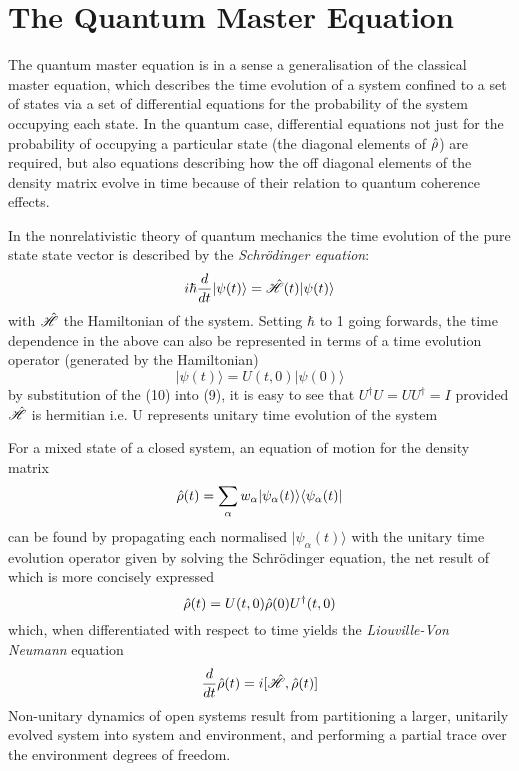
\section{The Quantum Master Equation}
The quantum master equation is in a sense a generalisation of the classical master equation, which describes the time evolution of a system confined to a set of states via a set of differential equations for the probability of the system occupying each state. In the quantum case, differential equations not just for the probability of occupying a particular state (the diagonal elements of $\hat{\rho}$) are required, but also equations describing how the off diagonal elements of the density matrix evolve in time because of their relation to quantum coherence effects.

In the nonrelativistic theory of quantum mechanics the time evolution of the pure state state vector is described by the \emph{Schr\"odinger equation}:
\begin{equation}
	i\hbar \frac{d}{dt} |\psi(t)\rangle = \hat{\mathscr{H}}(t) |\psi(t) \rangle
\end{equation}
with $\hat{\mathscr{H}}$ the Hamiltonian of the system. Setting $\hbar$ to 1 going forwards, the time dependence in the above can also be represented in terms of a time evolution operator (generated by the Hamiltonian)
\begin{equation}
	|\psi(t) \rangle = U(t, 0) | \psi(0) \rangle
\end{equation}
by substitution of the (10) into (9), it is easy to see that $U^{\dagger}U = UU^\dagger = I$ provided $\hat{\mathscr{H}}$ is hermitian i.e. U represents unitary time evolution of the system

For a mixed state of a closed system, an equation of motion for the density matrix
\begin{equation}
	\hat{\rho} (t) = \sum_\alpha w_{\alpha} |\psi_\alpha (t) \rangle \langle \psi_\alpha (t) |
\end{equation}
can be found by propagating each normalised $| \psi_\alpha (t) \rangle$ with the unitary time evolution operator given by solving the Schr\"odinger equation, the net result of which is more concisely expressed
\begin{equation}
	\hat{\rho} (t) = U(t, 0)\hat{\rho} (0) U^\dagger (t, 0)
	\label{eq:timeprop}
\end{equation}
which, when differentiated with respect to time yields the \emph{Liouville-Von Neumann} equation
\begin{equation}
	\frac{d}{dt}\hat{\rho}(t) = i [\hat{\mathscr{H}}, \hat{\rho} (t) ]
\end{equation}
Non-unitary dynamics of open systems result from partitioning a larger, unitarily evolved system into system and environment, and performing a partial trace over the environment degrees of freedom.

